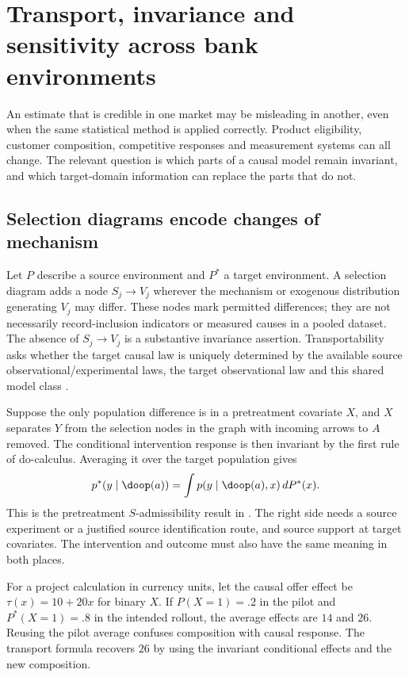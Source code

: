 \chapter{Transport, invariance and sensitivity across bank environments}
\label{r3:transport}
An estimate that is credible in one market may be misleading in another,
even when the same statistical method is applied correctly.
Product eligibility, customer composition, competitive responses and
measurement systems can all change. The relevant question is which
parts of a causal model remain invariant, and which target-domain
information can replace the parts that do not.

\section{Selection diagrams encode changes of mechanism}
\label{r3:selection-diagram}
Let $P$ describe a source environment and $P^*$ a target environment.
A selection diagram adds a node $S_j\to V_j$ wherever the mechanism
or exogenous distribution generating $V_j$ may differ. These nodes
mark permitted differences; they are not necessarily record-inclusion
indicators or measured causes in a pooled dataset. The absence of
$S_j\to V_j$ is a substantive invariance assertion. Transportability
asks whether the target causal law is uniquely determined by the
available source observational/experimental laws, the target
observational law and this shared model class
\citep[Definitions 4--5]{pearltransport2014}.

Suppose the only population difference is in a pretreatment covariate
$X$, and $X$ separates $Y$ from the selection nodes in the graph with
incoming arrows to $A$ removed. The conditional intervention response
is then invariant by the first rule of do-calculus. Averaging it
over the target population gives
\begin{equation}
 p^*(y\mid\doop(a))
     =\int p(y\mid\doop(a),x)\,dP^*(x).
 \label{r3:transport-formula}
\end{equation}
This is the pretreatment $S$-admissibility result in
\citet[Theorem 2 and Corollary 1]{pearltransport2014}. The right
side needs a source experiment or a justified source identification
route, and source support at target covariates. The intervention and
outcome must also have the same meaning in both places.

For a project calculation in currency units, let the causal offer
effect be $\tau(x)=10+20x$ for binary $X$. If $P(X=1)=.2$ in the
pilot and $P^*(X=1)=.8$ in the intended rollout, the average effects
are $14$ and $26$. Reusing the pilot average confuses composition
with causal response. The transport formula recovers $26$ by using
the invariant conditional effects and the new composition.

